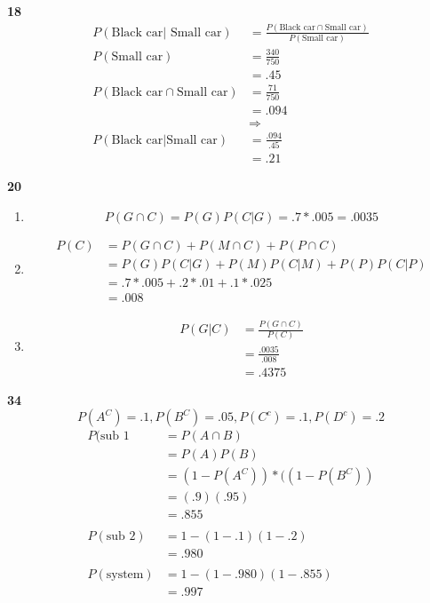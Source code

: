 \documentclass[12pt]{report}
\begin{document}
        {\bf 18}
        \begin{align*}
          P(\text{Black car}|\text{ Small car})&=\frac{P(\text{Black car} \cap \text{Small car})}{P(\text{Small car})}\\
              P(\text{Small car})&=\frac{340}{750}\\
              &=.45\\
              P(\text{Black car} \cap \text{Small car})&=\frac{71}{750}\\
              &=.094\\
              &\Rightarrow\\
              P(\text{Black car}|\text{Small car})&= \frac{.094}{.45}\\
                &=.21
        \end{align*}
        
        {\bf 20}
        \begin{enumerate}[label={\bf \alph*}]
        \item $$P(G \cap C ) = P(G)P(C|G)=.7*.005= .0035$$
        \item
          \begin{align*}
            P(C)&= P(G \cap C) + P(M \cap C) + P(P \cap C)\\
            &= P(G)P(C|G) +P(M)P(C|M) +P(P)P(C|P)\\
            &= .7 * .005 + .2* .01 + .1 * .025\\
            &= .008
          \end{align*}
        \item
          \begin{align*}
            P(G|C)&= \frac {P(G \cap C)}{P(C)}\\
            &=\frac{.0035}{.008}\\
            &=.4375
          \end{align*}
        \end{enumerate}
            {\bf 34}
            $$P(A^C)=.1,P(B^C)=.05,P(C^c)=.1,P(D^c)=.2$$
            \begin{align*}
              P(\text{sub 1}&=P(A \cap B)\\
              &=P(A)P(B)\\
              &=(1-P(A^C))*((1-P(B^C))\\
              &=(.9)(.95)\\
              &=.855\\
              \\
              P(\text{sub 2})&= 1-(1-.1)(1-.2)\\
              &=.980\\
              \\
              P(\text{system})&=1-(1-.980)(1-.855)\\
              &=.997
            \end{align*}
\end{document}
